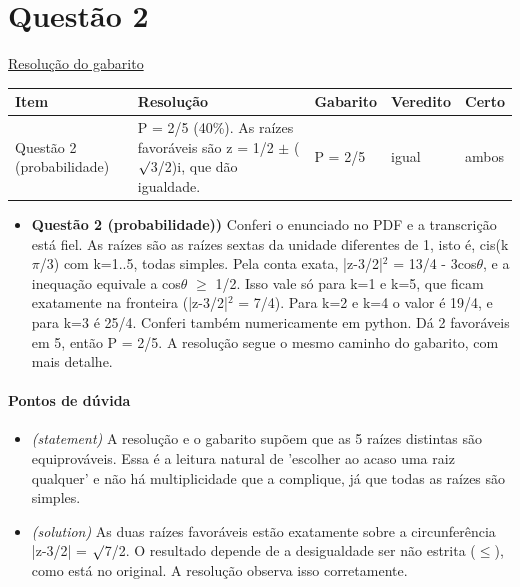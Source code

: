 \documentclass{article}%
\begin{document}
\section*{Questão 2}%
\href{https://poliedroresolve.sistemapoliedro.com.br/vestibulares/ime/2027/ime-2-fase-dia-1-26-10-2026-2-fase-dia-1/dissertativa-2-matematica-2-fase-dia-1-ime-2027}{Resolução do gabarito}\par\smallskip%
\begin{longtable}{@{}p{} p{} p{} p{} p{}@{}}\toprule Item & Resolução & Gabarito & Veredito & Certo \\ \midrule
Questão 2 (probabilidade) & P = 2/5 (40\%). As raízes favoráveis são z = 1/2 $\pm$ ($\surd$3/2)i, que dão igualdade. & P = 2/5 & igual & ambos \\
\bottomrule\end{longtable}%
\begin{itemize}%
\item%
\textbf{Questão 2 (probabilidade))} Conferi o enunciado no PDF e a transcrição está fiel. As raízes são as raízes sextas da unidade diferentes de 1, isto é, cis(k$\pi$/3) com k=1..5, todas simples. Pela conta exata, |z-3/2|$^2$ = 13/4 - 3cos$\theta$, e a inequação equivale a cos$\theta$ $\geq$ 1/2. Isso vale só para k=1 e k=5, que ficam exatamente na fronteira (|z-3/2|$^2$ = 7/4). Para k=2 e k=4 o valor é 19/4, e para k=3 é 25/4. Conferi também numericamente em python. Dá 2 favoráveis em 5, então P = 2/5. A resolução segue o mesmo caminho do gabarito, com mais detalhe.%
\end{itemize}%
\paragraph{Pontos de dúvida}%
\begin{itemize}%
\item%
\textit{(statement)} A resolução e o gabarito supõem que as 5 raízes distintas são equiprováveis. Essa é a leitura natural de 'escolher ao acaso uma raiz qualquer' e não há multiplicidade que a complique, já que todas as raízes são simples.%
\item%
\textit{(solution)} As duas raízes favoráveis estão exatamente sobre a circunferência |z-3/2| = $\surd$7/2. O resultado depende de a desigualdade ser não estrita ($\leq$), como está no original. A resolução observa isso corretamente.%
\end{itemize}%
\end{document}
